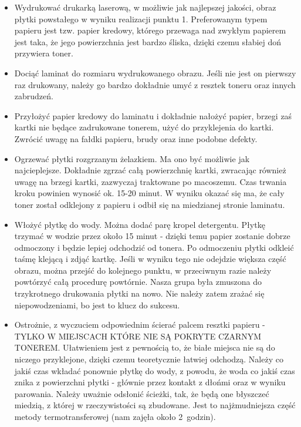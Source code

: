 \begin{itemize}
\item Wydrukować drukarką laserową, w możliwie jak najlepszej jakości, obraz płytki powstałego w wyniku realizacji punktu 1. Preferowanym typem papieru jest tzw. papier kredowy, którego przewaga nad zwykłym papierem jest taka, że  jego powierzchnia jest bardzo śliska, dzięki czemu słabiej doń przywiera toner.
\item Dociąć laminat do rozmiaru wydrukowanego obrazu. Jeśli nie jest on pierwszy raz drukowany, należy go bardzo dokładnie umyć z resztek toneru oraz innych zabrudzeń.
\item Przyłożyć papier kredowy do laminatu i dokładnie nałożyć papier, brzegi zaś kartki nie będące zadrukowane tonerem, użyć do przyklejenia do kartki. Zwrócić uwagę na fałdki papieru, brudy oraz inne podobne defekty.
\item Ogrzewać płytki rozgrzanym żelazkiem. Ma ono być możliwie jak najcieplejsze. Dokładnie zgrzać całą powierzchnię kartki, zwracając również uwagę na brzegi kartki, zazwyczaj traktowane po macoszemu. Czas trwania kroku powinien wynosić ok. 15-20 minut. W wyniku okazać się ma, że cały toner został odklejony z papieru i odbił się na miedzianej stronie laminatu.
\item Włożyć płytkę do wody. Można dodać parę kropel detergentu. Płytkę trzymać w wodzie przez około 15 minut - dzięki temu papier zostanie dobrze odmoczony i będzie lepiej odchodzić od tonera. Po odmoczeniu płytki odkleić taśmę klejącą i zdjąć kartkę. Jeśli w wyniku tego nie odejdzie większa część obrazu, można przejść do kolejnego punktu, w przeciwnym razie należy powtórzyć całą procedurę powtórnie. Nasza grupa była zmuszona do trzykrotnego drukowania płytki na nowo. Nie należy zatem zrażać się niepowodzeniami, bo jest to klucz do sukcesu.
\item Ostrożnie, z wyczuciem odpowiednim ścierać palcem resztki papieru - TYLKO W MIEJSCACH KTÓRE NIE SĄ POKRYTE CZARNYM TONEREM. Ułatwieniem jest z pewnością to, że białe miejsca nie są do niczego przyklejone, dzięki czemu teoretycznie łatwiej odchodzą. Należy co jakiś czas wkładać ponownie płytkę do wody, z powodu, że woda co jakiś czas znika z powierzchni płytki - głównie przez kontakt z dłońmi oraz w wyniku parowania. Należy uważnie odsłonić ścieżki, tak, że będą one błyszczeć miedzią, z której w rzeczywistości są zbudowane. Jest to najżmudniejsza część metody termotransferowej (nam zajęła około 2~godzin).
\end{itemize}

